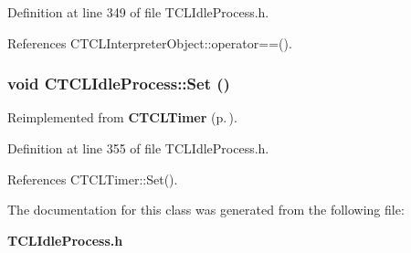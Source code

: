 Definition at line 349 of file TCLIdle\-Process.h.

References CTCLInterpreter\-Object::operator==().
\subsubsection{\setlength{\rightskip}{0pt plus 5cm}void CTCLIdle\-Process::Set ()\hspace{0.3cm}{\tt  [inline]}}\label{classCTCLIdleProcess_a4}




Reimplemented from {\bf CTCLTimer} {\rm (p.\,\pageref{classCTCLTimer_a7})}.

Definition at line 355 of file TCLIdle\-Process.h.

References CTCLTimer::Set().

The documentation for this class was generated from the following file:\begin{CompactItemize}
\item 
{\bf TCLIdle\-Process.h}\end{CompactItemize}
